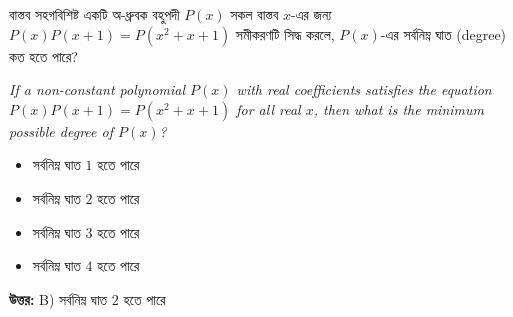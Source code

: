 \documentclass[12pt, a4paper]{article}
\begin{document}
\vspace{1em}

\begin{tcolorbox}[questionbox={প্রশ্ন (Question) 34}]
    \noindent
    বাস্তব সহগবিশিষ্ট একটি অ-ধ্রুবক বহুপদী $P(x)$ সকল বাস্তব $x$-এর জন্য $P(x)P(x+1) = P(x^2+x+1)$ সমীকরণটি সিদ্ধ করলে, $P(x)$-এর সর্বনিম্ন ঘাত (degree) কত হতে পারে?
    
    \vspace{0.8em}
    \begin{english}
    \noindent\textit{\color{darkgray}
    If a non-constant polynomial $P(x)$ with real coefficients satisfies the equation $P(x)P(x+1) = P(x^2+x+1)$ for all real $x$, then what is the minimum possible degree of $P(x)$?
    }
    \end{english}
\end{tcolorbox}

\begin{itemize}[label={}, leftmargin=1cm, itemsep=0.5em]
    \item[\textbf{A)}] সর্বনিম্ন ঘাত $1$ হতে পারে
    \item[\textbf{B)}] সর্বনিম্ন ঘাত $2$ হতে পারে
    \item[\textbf{C)}] সর্বনিম্ন ঘাত $3$ হতে পারে
    \item[\textbf{D)}] সর্বনিম্ন ঘাত $4$ হতে পারে
\end{itemize}

\vspace{0.5em}
\begin{tcolorbox}[answerbox]
    \textbf{\color{success} উত্তর:} B) সর্বনিম্ন ঘাত $2$ হতে পারে
\end{tcolorbox}
\vspace{1em}
\end{document}
